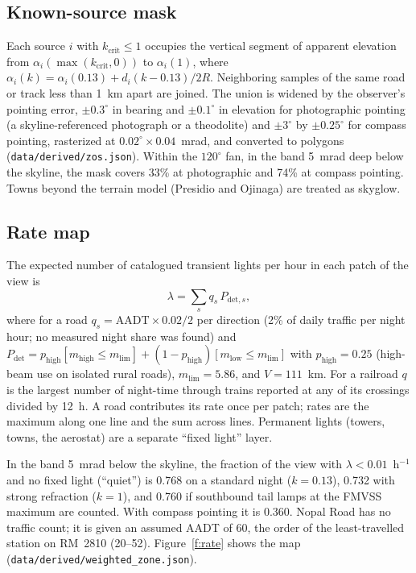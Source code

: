 \documentclass[11pt]{article}
\newcommand{\kc}{k_{\mathrm{crit}}}
\begin{document}
\subsection{Known-source mask}

Each source $i$ with $\kc\le1$ occupies the vertical segment of apparent elevation from $\alpha_i(\max(\kc,0))$ to $\alpha_i(1)$, where $\alpha_i(k)=\alpha_i(0.13)+d_i(k-0.13)/2R$. Neighboring samples of the same road or track less than 1~km apart are joined. The union is widened by the observer's pointing error, $\pm0.3^\circ$ in bearing and $\pm0.1^\circ$ in elevation for photographic pointing (a skyline-referenced photograph or a theodolite) and $\pm3^\circ$ by $\pm0.25^\circ$ for compass pointing, rasterized at $0.02^\circ\times0.04$~mrad, and converted to polygons (\texttt{data/derived/zos.json}). Within the $120^\circ$ fan, in the band 5~mrad deep below the skyline, the mask covers 33\% at photographic and 74\% at compass pointing. Towns beyond the terrain model (Presidio and Ojinaga) are treated as skyglow.

\subsection{Rate map}

The expected number of catalogued transient lights per hour in each patch of the view is
\begin{equation}
\lambda=\sum_s q_s\,P_{\mathrm{det},s},
\end{equation}
where for a road $q_s=\mathrm{AADT}\times0.02/2$ per direction (2\% of daily traffic per night hour; no measured night share was found) and $P_{\mathrm{det}}=p_{\mathrm{high}}[m_{\mathrm{high}}\le m_{\mathrm{lim}}]+(1-p_{\mathrm{high}})[m_{\mathrm{low}}\le m_{\mathrm{lim}}]$ with $p_{\mathrm{high}}=0.25$ (high-beam use on isolated rural roads\cite{Reagan2017}), $m_{\mathrm{lim}}=5.86$, and $V=111$~km. For a railroad $q$ is the largest number of night-time through trains reported at any of its crossings divided by 12~h. A road contributes its rate once per patch; rates are the maximum along one line and the sum across lines. Permanent lights (towers, towns, the aerostat) are a separate ``fixed light'' layer.

In the band 5~mrad below the skyline, the fraction of the view with $\lambda<0.01$~h$^{-1}$ and no fixed light (``quiet'') is 0.768 on a standard night ($k=0.13$), 0.732 with strong refraction ($k=1$), and 0.760 if southbound tail lamps at the FMVSS maximum are counted. With compass pointing it is 0.360. Nopal Road has no traffic count; it is given an assumed AADT of 60, the order of the least-travelled station on RM~2810 (20--52). Figure~\ref{f:rate} shows the map (\texttt{data/derived/weighted\_zone.json}).
\end{document}
